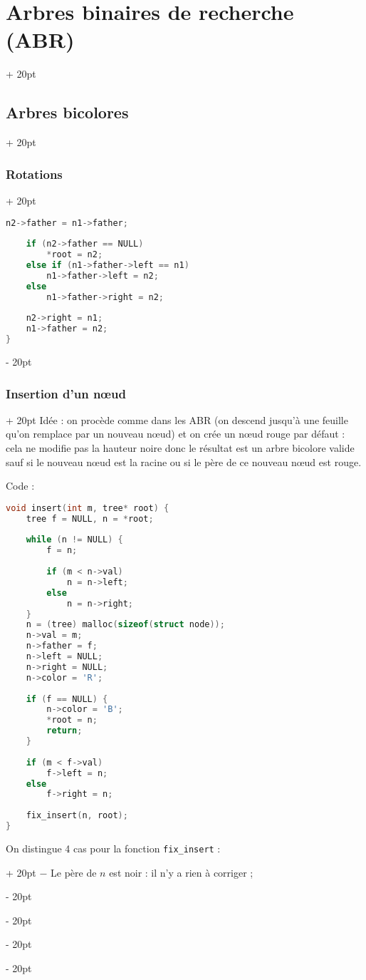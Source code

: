 \documentclass[a4paper, 12pt, twoside]{article}
\newcommand{\ind}[1][20pt]{\advance\leftskip + #1}
\newcommand{\deind}[1][20pt]{\advance\leftskip - #1}
\newenvironment{indt}[2][20pt]{#2 \par \ind[#1]}{\par \deind} %
\begin{document}
\begin{indt}{\section{Arbres binaires de recherche (ABR)}}
\begin{indt}{\subsection{Arbres bicolores}}
\begin{indt}{\subsubsection{Rotations}}
\begin{lstlisting}[language=C, xleftmargin=80pt]
    n2->father = n1->father;
    
    if (n2->father == NULL)
        *root = n2;
    else if (n1->father->left == n1)
        n1->father->left = n2;
    else
        n1->father->right = n2;
    
    n2->right = n1;
    n1->father = n2;
}\end{lstlisting}
            \end{indt}
            
            \vspace{12pt}
            
            \begin{indt}{\subsubsection{Insertion d'un n\oe ud}}
                Idée : on procède comme dans les ABR (on descend jusqu'à une feuille qu'on remplace par un nouveau n\oe ud) et on crée un n\oe ud rouge par défaut : cela ne modifie pas la hauteur noire donc le résultat est un arbre bicolore valide sauf si le nouveau n\oe ud est la racine ou si le père de ce nouveau n\oe ud est rouge.
                
                Code :
                
                \newpage
                
                \begin{lstlisting}[language=C, xleftmargin=80pt]
void insert(int m, tree* root) {
    tree f = NULL, n = *root;
    
    while (n != NULL) {
        f = n;
        
        if (m < n->val)
            n = n->left;
        else
            n = n->right;
    }
    n = (tree) malloc(sizeof(struct node));
    n->val = m;
    n->father = f;
    n->left = NULL;
    n->right = NULL;
    n->color = 'R';
    
    if (f == NULL) {
        n->color = 'B';
        *root = n;
        return;
    }
    
    if (m < f->val)
        f->left = n;
    else
        f->right = n;
    
    fix_insert(n, root);
}\end{lstlisting}
                
                \begin{indt}{On distingue 4 cas pour la fonction \texttt{fix\_insert} :}
                    $-$ Le père de $n$ est noir : il n'y a rien à corriger ;
                    

\end{indt}
\end{indt}
\end{indt}
\end{indt}
\end{document}
